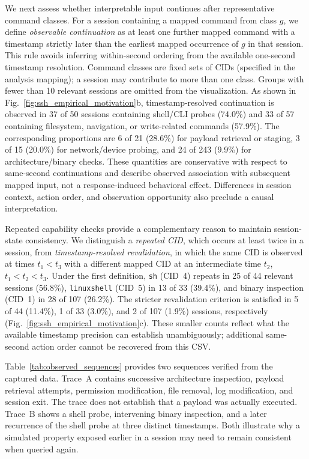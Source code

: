 We next assess whether interpretable input continues after representative
command classes. For a session containing a mapped command from class
$g$, we define \emph{observable continuation} as at least one further
mapped command with a timestamp strictly later than the earliest mapped
occurrence of $g$ in that session. This rule avoids inferring within-second
ordering from the available one-second timestamp resolution. Command
classes are fixed sets of CIDs (specified in the analysis mapping); a
session may contribute to more than one class. Groups with fewer than
10 relevant sessions are omitted from the visualization. As shown in
Fig.~\ref{fig:ssh_empirical_motivation}b, timestamp-resolved continuation
is observed in 37 of 50 sessions containing shell/CLI probes (74.0\%) and
33 of 57 containing filesystem, navigation, or write-related commands
(57.9\%). The corresponding proportions are 6 of 21 (28.6\%) for payload
retrieval or staging, 3 of 15 (20.0\%) for network/device probing, and
24 of 243 (9.9\%) for architecture/binary checks. These quantities are
conservative with respect to same-second continuations and describe
observed association with subsequent mapped input, not a response-induced
behavioral effect. Differences in session context, action order, and
observation opportunity also preclude a causal interpretation.

Repeated capability checks provide a complementary reason to maintain
session-state consistency. We distinguish a \emph{repeated CID}, which
occurs at least twice in a session, from \emph{timestamp-resolved
revalidation}, in which the same CID is observed at times $t_1<t_3$
with a different mapped CID at an intermediate time $t_2$,
$t_1<t_2<t_3$. Under the first definition,
\texttt{sh} (CID~4) repeats in 25 of 44 relevant sessions (56.8\%),
\texttt{linuxshell} (CID~5) in 13 of 33 (39.4\%), and
binary inspection (CID~1) in 28 of 107 (26.2\%). The stricter
revalidation criterion is satisfied in 5 of 44 (11.4\%), 1 of 33
(3.0\%), and 2 of 107 (1.9\%) sessions, respectively
(Fig.~\ref{fig:ssh_empirical_motivation}c). These smaller counts reflect
what the available timestamp precision can establish unambiguously;
additional same-second action order cannot be recovered from this CSV.

Table~\ref{tab:observed_sequences} provides two sequences verified from
the captured data. Trace~A contains successive architecture inspection,
payload retrieval attempts, permission modification, file removal,
log modification, and session exit. The trace does not establish that a
payload was actually executed. Trace~B shows a shell probe, intervening
binary inspection, and a later recurrence of the shell probe at three
distinct timestamps. Both illustrate why a simulated property exposed
earlier in a session may need to remain consistent when queried again.

